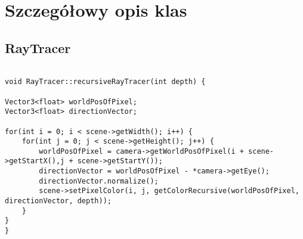 \section{Szczegółowy opis klas}
	\subsection{RayTracer}
	
\begin{lstlisting}

void RayTracer::recursiveRayTracer(int depth) {

Vector3<float> worldPosOfPixel;
Vector3<float> directionVector;

for(int i = 0; i < scene->getWidth(); i++) {
    for(int j = 0; j < scene->getHeight(); j++) {
        worldPosOfPixel = camera->getWorldPosOfPixel(i + scene->getStartX(),j + scene->getStartY());
        directionVector = worldPosOfPixel - *camera->getEye();
        directionVector.normalize();
        scene->setPixelColor(i, j, getColorRecursive(worldPosOfPixel, directionVector, depth));
    }
}
}
\end{lstlisting}	

